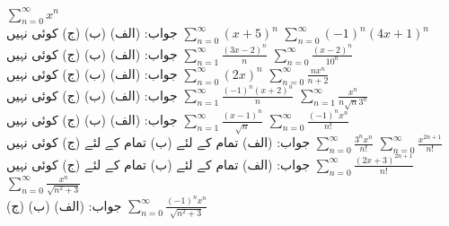   $\sum\limits_{n=0}^{\infty}x^n$\\
جواب:\quad
(الف)   (ب)   (ج) کوئی نہیں
  $\sum\limits_{n=0}^{\infty}(x+5)^n$
  $\sum\limits_{n=0}^{\infty}(-1)^n(4x+1)^n$\\
جواب:\quad
(الف)  (ب)   (ج) کوئی نہیں
  $\sum\limits_{n=1}^{\infty}\frac{(3x-2)^n}{n}$
  $\sum\limits_{n=0}^{\infty}\frac{(x-2)^n}{10^n}$\\
جواب:\quad
(الف)   (ب)   (ج) کوئی نہیں
  $\sum\limits_{n=0}^{\infty}(2x)^n$
  $\sum\limits_{n=0}^{\infty}\frac{nx^n}{n+2}$\\
جواب:\quad
(الف)   (ب)   (ج) کوئی نہیں
  $\sum\limits_{n=1}^{\infty}\frac{(-1)^n(x+2)^n}{n}$
  $\sum\limits_{n=1}^{\infty}\frac{x^n}{n\sqrt{n}3^n}$\\
جواب:\quad
(الف)   (ب)   (ج)  کوئی نہیں
  $\sum\limits_{n=1}^{\infty}\frac{(x-1)^n}{\sqrt{n}}$
  $\sum\limits_{n=0}^{\infty}\frac{(-1)^nx^n}{n!}$\\
جواب:\quad
(الف) تمام  کے لئے   (ب) تمام  کے لئے  (ج)  کوئی نہیں
  $\sum\limits_{n=0}^{\infty}\frac{3^nx^n}{n!}$
  $\sum\limits_{n=0}^{\infty}\frac{x^{2n+1}}{n!}$\\
جواب:\quad
(الف) تمام  کے لئے   (ب) تمام  کے لئے   (ج)  کوئی نہیں
  $\sum\limits_{n=0}^{\infty}\frac{(2x+3)^{2n+1}}{n!}$
  $\sum\limits_{n=0}^{\infty}\frac{x^n}{\sqrt{n^2+3}}$\\
جواب:\quad
(الف)   (ب)   (ج)  
  $\sum\limits_{n=0}^{\infty}\frac{(-1)^nx^n}{\sqrt{n^2+3}}$

